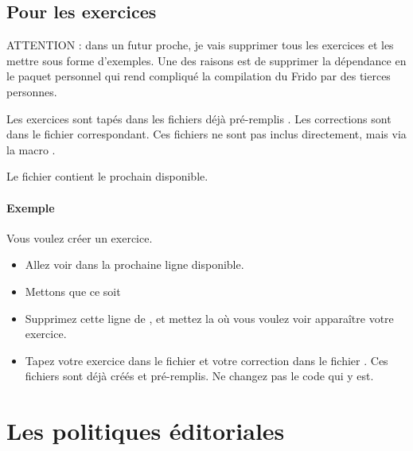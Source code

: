 \subsection{Pour les exercices}

ATTENTION : dans un futur proche, je vais supprimer tous les exercices et les mettre sous forme d'exemples. Une des raisons est de supprimer la dépendance en le paquet personnel  qui rend compliqué la compilation du Frido par des tierces personnes.

\vspace{1cm}

Les exercices sont tapés dans les fichiers déjà pré-remplis . Les corrections sont dans le fichier  correspondant. Ces fichiers ne sont pas inclus directement, mais via la macro .

Le fichier  contient le prochain disponible.

\paragraph{Exemple}

Vous voulez créer un exercice.
\begin{itemize}
    \item Allez voir dans  la prochaine ligne  disponible.
    \item Mettons que ce soit   
    \item Supprimez cette ligne de , et mettez la où vous voulez voir apparaître votre exercice.
    \item Tapez votre exercice dans le fichier  et votre correction dans le fichier . Ces fichiers sont déjà créés et pré-remplis. Ne changez pas le code qui y est.
\end{itemize}

\section{Les politiques éditoriales}

